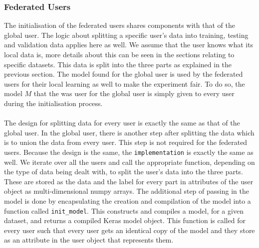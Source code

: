 \documentclass[12pt]{article}
\begin{document}
\subsubsection{Federated Users}
The initialisation of the federated users shares components with that of the global user. The logic about splitting a specific user's data into training, testing and validation data applies here as well. We assume that the user knows what its local data is, more details about this can be seen in the sections relating to specific datasets. This data is split into the three parts as explained in the previous section. The model found for the global user is used by the federated users for their local learning as well to make the experiment fair. To do so, the model $M$ that the was user for the global user is simply given to every user during the initialisation process.
\\\\
The design for splitting data for every user is exactly the same as that of the global user. In the global user, there is another step after splitting the data which is to union the data from every user. This step is not required for the federated users. Because the design is the same, the \texttt{implementation} is exactly the same as well. We iterate over all the users and call the appropriate function, depending on the type of data being dealt with, to split the user's data into the three parts. These are stored as the data and the label for every part in attributes of the user object as multi-dimensional numpy arrays. The additional step of passing in the model is done by encapsulating the creation and compilation of the model into a function called \texttt{init\_model}. This constructs and compiles a model, for a given dataset, and returns a compiled Keras model object. This function is called for every user such that every user gets an identical copy of the model and they store as an attribute in the user object that represents them. 
\end{document}
